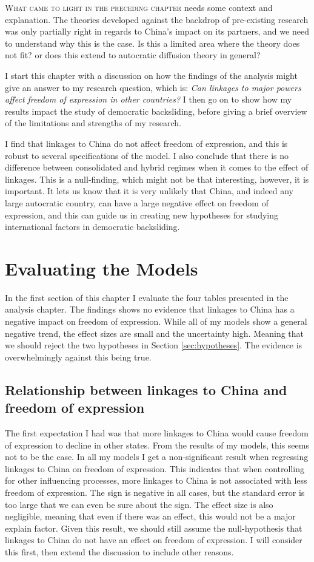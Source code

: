 \lettrine{W}{hat came to light in the preceding chapter} needs some context and explanation. The theories developed against the backdrop of pre-existing research was only partially right in regards to China's impact on its partners, and we need to understand why this is the case. Is this a limited area where the theory does not fit? or does this extend to autocratic diffusion theory in general?

I start this chapter with a discussion on how the findings of the analysis might give an answer to my research question, which is: \textit{Can linkages to major powers affect freedom of expression in other countries?} I then go on to show how my results impact the study of democratic backsliding, before giving a brief overview of the limitations and strengths of my research. 

I find that linkages to China do not affect freedom of expression, and this is robust to several specifications of the model. I also conclude that there is no difference between consolidated and hybrid regimes when it comes to the effect of linkages. This is a null-finding, which might not be that interesting, however, it is important. It lets us know that it is very unlikely that China, and indeed any large autocratic country, can have a large negative effect on freedom of expression, and this can guide us in creating new hypotheses for studying international factors in democratic backsliding. 

\section{Evaluating the Models}
In the first section of this chapter I evaluate the four tables presented in the analysis chapter. The findings shows no evidence that linkages to China has a negative impact on freedom of expression. While all of my models show a general negative trend, the effect sizes are small and the uncertainty high. Meaning that we should reject the two hypotheses in Section \ref{sec:hypotheses}. The evidence is overwhelmingly against this being true. 

\subsection{Relationship between linkages to China and freedom of expression}
The first expectation I had was that more linkages to China would cause freedom of expression to decline in other states. From the results of my models, this seems not to be the case. In all my models  I get a non-significant result when regressing linkages to China on freedom of expression. This indicates that when controlling for other influencing processes, more linkages to China is not associated with less freedom of expression. The sign is negative in all cases, but the standard error is too large that we can even be sure about the sign. The effect size is also negligible, meaning that even if there was an effect, this would not be a major explain factor. Given this result, we should still assume the null-hypothesis that linkages to China do not have an effect on freedom of expression. I will consider this first, then extend the discussion to include other reasons. 

